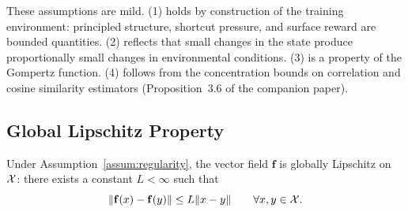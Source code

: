 These assumptions are mild. (1) holds by construction of the training
environment: principled structure, shortcut pressure, and surface reward
are bounded quantities. (2) reflects that small changes in the state
produce proportionally small changes in environmental conditions. (3) is
a property of the Gompertz function. (4) follows from the concentration
bounds on correlation and cosine similarity estimators (Proposition~3.6
of the companion paper).

\subsection{Global Lipschitz Property}

\begin{lemma}
\label{lem:lipschitz}
Under Assumption~\ref{assum:regularity}, the vector field $\mathbf{f}$
is globally Lipschitz on $\mathcal{X}$: there exists a constant $L < \infty$ such that
\[
\|\mathbf{f}(x) - \mathbf{f}(y)\| \leq L \|x - y\| \qquad \forall x, y \in \mathcal{X}.
\]
\end{lemma}

